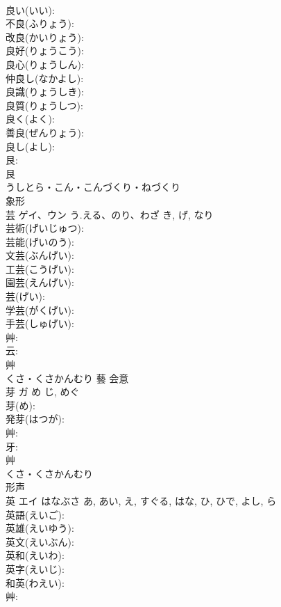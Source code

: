 \documentclass[8pt]{extreport}
\begin{document}
\begin{CJK}{UTF8}{min}
\\	良い(いい): 
\\	不良(ふりょう): 
\\	改良(かいりょう): 
\\	良好(りょうこう): 
\\	良心(りょうしん): 
\\	仲良し(なかよし): 
\\	良識(りょうしき): 
\\	良質(りょうしつ): 
\\	良く(よく): 
\\	善良(ぜんりょう): 
\\	良し(よし): 
\\	艮: 
\\	艮	
\\	うしとら・こん・こんづくり・ねづくり	
\\	象形 
\\	芸	ゲイ、ウン	う.える、のり、わざ	き, げ, なり	
\\	芸術(げいじゅつ): 
\\	芸能(げいのう): 
\\	文芸(ぶんげい): 
\\	工芸(こうげい): 
\\	園芸(えんげい): 
\\	芸(げい): 
\\	学芸(がくげい): 
\\	手芸(しゅげい): 
\\	艸: 
\\	云: 
\\	艸	
\\	くさ・くさかんむり	藝	会意 
\\	芽	ガ	め	じ, めぐ	
\\	芽(め): 
\\	発芽(はつが): 
\\	艸: 
\\	牙: 
\\	艸	
\\	くさ・くさかんむり	
\\	形声 
\\	英	エイ	はなぶさ	あ, あい, え, すぐる, はな, ひ, ひで, よし, ら	
\\	英語(えいご): 
\\	英雄(えいゆう): 
\\	英文(えいぶん): 
\\	英和(えいわ): 
\\	英字(えいじ): 
\\	和英(わえい): 
\\	艸: 

\end{CJK}
\end{document}
